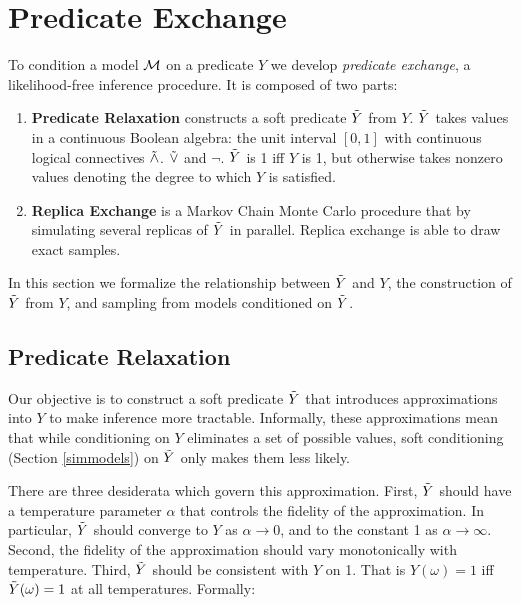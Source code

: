 \section{Predicate Exchange}

To condition a model ${\mathcal{M}}$ on a predicate $Y$ we develop \emph{predicate exchange}, a likelihood-free inference procedure.  It is composed of two parts:
\begin{enumerate}
\item \textbf{Predicate Relaxation} constructs a soft predicate $\tilde{Y}$ from $Y$. $\tilde{Y}$ takes values   in a continuous Boolean algebra: the unit interval $[0, 1]$ with continuous logical connectives $\mathrel{\tilde{\land}}$. $\mathrel{\tilde{\lor}}$ and $\neg$.
$\tilde{Y}$ is 1 iff $Y$ is 1, but otherwise takes nonzero values denoting the degree to which $Y$ is satisfied.
\item  \textbf{Replica Exchange} is a Markov Chain Monte Carlo procedure that by simulating several replicas of $\tilde{Y}$ in parallel. Replica exchange is able to draw exact samples. 
\end{enumerate}

In this section we formalize the relationship between $\tilde{Y}$ and $Y$, the construction of $\tilde{Y}$ from $Y$, and sampling from models conditioned on $\mathrel{\tilde{Y}}$.

\subsection{Predicate Relaxation}\label{predexchange}

Our objective is to construct a soft predicate $\tilde{Y}$ that introduces approximations into $Y$ to make inference more tractable.
Informally, these approximations mean that while conditioning on $Y$ eliminates a set of possible values, soft conditioning (Section \ref{simmodels}) on $\tilde{Y}$ only makes them less likely.

There are three desiderata which govern this approximation.
First, $\tilde{Y}$ should have a temperature parameter $\alpha$ that controls the fidelity of the approximation. In particular, $\tilde{Y}$ should converge to $Y$ as $\alpha \to 0$, and to the constant 1 as $\alpha \to \infty$. Second, the fidelity of the approximation should vary monotonically with temperature. Third, $\tilde{Y}$ should be consistent with $Y$ on 1. That is $Y(\omega) = 1$ iff $\tilde{Y}(\omega) = 1$ at all temperatures.  
Formally:

